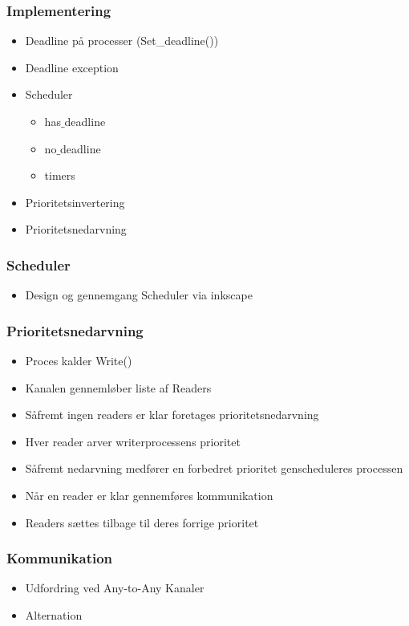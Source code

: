 \documentclass[12pt]{beamer}
\begin{document}
\begin{frame}
  \frametitle{Implementering}
  \begin{itemize}   
    \item Deadline på processer (Set\_deadline())
	\item Deadline exception
    \item Scheduler 
	\begin{itemize}
		\item has$\_$deadline 
		\item no$\_$deadline
		\item timers
	\end{itemize}
	\item Prioritetsinvertering
	\item Prioritetsnedarvning
  \end{itemize}
\end{frame}

\begin{frame}
  \frametitle{Scheduler}
\begin{itemize}
	\item Design og gennemgang Scheduler via inkscape
  \end{itemize}
\end{frame}

\begin{frame}
  \frametitle{Prioritetsnedarvning}
\begin{itemize}
	\item Proces kalder Write() 
	\item Kanalen gennemløber liste af Readers
	\item Såfremt ingen readers er klar foretages prioritetsnedarvning
	\item Hver reader arver writerprocessens prioritet 
	\item Såfremt nedarvning medfører en forbedret prioritet genscheduleres processen
	\item Når en reader er klar gennemføres kommunikation
	\item Readers sættes tilbage til deres forrige prioritet
  \end{itemize}
\end{frame}

\begin{frame}
\frametitle{Kommunikation}
\begin{itemize}
	\item Udfordring ved Any-to-Any Kanaler 
 	\item Alternation
\end{itemize} 
\end{frame} 
\end{document}
